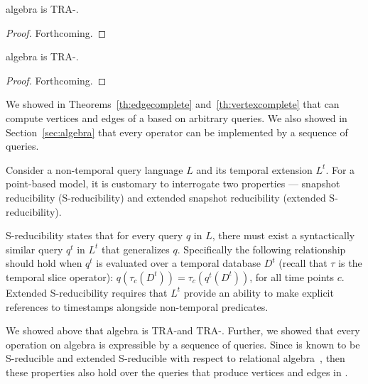 \begin{theorem}
\ql algebra is TRA-\edgec.
\label{th:edgecomplete}
\end{theorem}

\begin{proof}  Forthcoming.
\end{proof}

\begin{theorem}
\ql algebra is TRA-\vertexc.
\label{th:vertexcomplete}
\end{theorem}

\begin{proof}  Forthcoming.
\end{proof}

We showed in Theorems~\ref{th:edgecomplete}
and~\ref{th:vertexcomplete} that \ql can compute vertices and edges of
a \tg based on arbitrary \tra queries.  We also showed in
Section~\ref{sec:algebra} that every \ql operator can be implemented
by a sequence of \tra queries.

Consider a non-temporal query language $L$ and its temporal extension
$L^t$.  For a point-based model, it is customary to interrogate two
properties --- snapshot reducibility (S-reducibility) and extended
snapshot reducibility (extended S-reducibility).

S-reducibility states that for every query $q$ in $L$, there must
exist a syntactically similar query $q^t$ in $L^t$ that generalizes
$q$.  Specifically the following relationship should hold when $q^t$
is evaluated over a temporal database $D^t$ (recall that $\tau$ is the
temporal slice operator): $q(\tau_c(D^t)) = \tau_c(q^t(D^t))$, for all
time points $c$.  Extended S-reducibility requires that $L^t$ provide
an ability to make explicit references to timestamps alongside
non-temporal predicates.

 We showed above that \ql algebra
is TRA-\edgec and TRA-\vertexc.  Further, we showed that every
operation on \ql algebra is expressible by a sequence of \tra
queries. Since \tra is known to be S-reducible and extended S-reducible
with respect to relational algebra~\cite{}, then these properties also
hold over the queries that produce vertices and edges in \ql.



